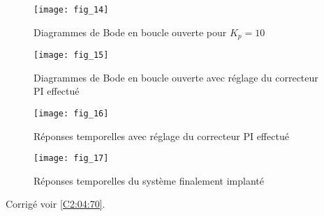 

\begin{figure}[H]
\centering
\texttt{[image: fig\_14]}
\caption{Diagrammes de Bode en boucle ouverte pour $K_p = 10$\label{fig_14}}
\end{figure}


\begin{figure}[H]
\centering
\texttt{[image: fig\_15]}
\caption{Diagrammes de Bode en boucle ouverte avec réglage du correcteur PI effectué \label{fig_15}}
\end{figure}

\begin{figure}[H]
\centering
\texttt{[image: fig\_16]}
\caption{Réponses temporelles avec réglage du correcteur PI effectué \label{fig_16}}
\end{figure}


\begin{figure}[H]
\centering
\texttt{[image: fig\_17]}
\caption{Réponses temporelles du système finalement implanté\label{fig_17}}
\end{figure}

\noindent\footnotesize
\normalsize

\begin{flushright}
\footnotesize{Corrigé  voir \ref{C2:04:70}.}
\end{flushright}%
\fi